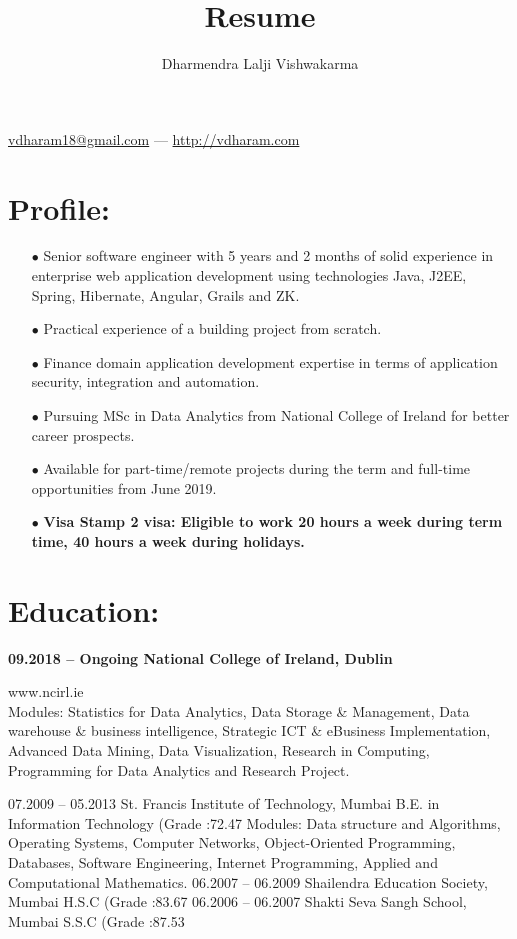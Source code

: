 \documentclass{article}
\makeatletter
\renewcommand{\maketitle}{
\begin{center}
{\huge\bfseries
\theauthor}

\vspace{0.25em}
\href{mailto:vdharam18@gmail.com}{vdharam18@gmail.com} --- \href{http://vdharam.com}{http://vdharam.com}
\end{center}	
}
\makeatother
\begin{document}
\title{Resume}
\author{Dharmendra Lalji Vishwakarma}
\maketitle

\section{Profile:}
\begin{itemize}
	
\item[$\bullet$]
Senior software engineer with 5 years and 2 months of solid experience in enterprise web application development using technologies Java, J2EE, Spring, Hibernate, Angular, Grails and ZK.
\item[$\bullet$]
Practical experience of a building project from scratch.
\item[$\bullet$]
Finance domain application development expertise in terms of application security, integration and automation.
\item[$\bullet$]
Pursuing MSc in Data Analytics from National College of Ireland for better career prospects.
\item[$\bullet$]
Available for part-time/remote projects during the term and full-time opportunities from June 2019.
\item[$\bullet$]
\bfseries Visa\linebreak
Stamp 2 visa: Eligible to work 20 hours a week during term time, 40 hours a week during holidays.

	 
\end{itemize}

\section{Education:}

\textbf{09.2018 – Ongoing \hfill National College of Ireland, Dublin\\}

 \hfill www.ncirl.ie \\
Modules: Statistics for Data Analytics, Data Storage \& Management, Data warehouse \& business intelligence, Strategic ICT \& eBusiness Implementation, Advanced Data Mining, Data Visualization, Research in Computing, Programming for Data Analytics and Research Project.

07.2009 – 05.2013 St. Francis Institute of Technology, Mumbai
B.E. in Information Technology (Grade :72.47%
Modules: Data structure and Algorithms, Operating Systems, Computer Networks, Object-Oriented Programming, Databases, Software Engineering, Internet Programming, Applied and Computational Mathematics.
06.2007 – 06.2009 Shailendra Education Society, Mumbai
H.S.C (Grade :83.67%
06.2006 – 06.2007 Shakti Seva Sangh School, Mumbai
S.S.C (Grade :87.53%
\end{document}

